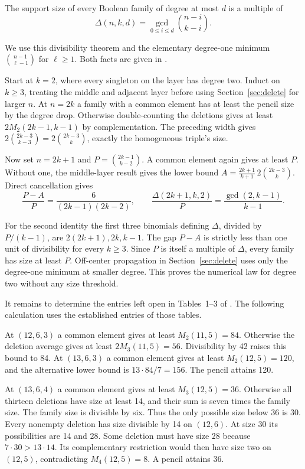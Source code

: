 \documentclass[11pt,letterpaper]{article}
\numberwithin{equation}{section}
\begin{document}
The support size of every Boolean family of degree at most $d$ is a multiple of
\[
\Delta(n,k,d)=\gcd_{0\le i\le d}\binom{n-i}{k-i}.
\]

We use this divisibility theorem and the elementary degree-one minimum $\binom{n-1}{\ell-1}$
for $\ell\ge1$. Both facts are given in \cite[Sections 2 and 7]{kmw}.

Start at $k=2$, where every singleton on the layer has degree two. Induct on $k\ge3$, treating
the middle and adjacent layer before using Section~\ref{sec:delete} for larger $n$. At $n=2k$
a family with a common element has at least the pencil size by the degree drop. Otherwise
double-counting the deletions gives at least $2M_{2}(2k-1,k-1)$ by complementation. The
preceding width gives $2\binom{2k-3}{k-3}=2\binom{2k-3}{k}$, exactly the homogeneous triple's
size.

Now set $n=2k+1$ and $P=\binom{2k-1}{k-2}$. A common element again gives at least $P$. Without
one, the middle-layer result gives the lower bound $A=\frac{2k+1}{k+1}\,2\binom{2k-3}{k}$.
Direct cancellation gives
\[
\frac{P-A}{P}=\frac{6}{(2k-1)(2k-2)},\qquad
\frac{\Delta(2k+1,k,2)}{P}=\frac{\gcd(2,k-1)}{k-1}.
\]

For the second identity the first three binomials defining $\Delta$, divided by $P/(k-1)$, are
$2(2k+1),2k,k-1$. The gap $P-A$ is strictly less than one unit of divisibility for every
$k\ge3$. Since $P$ is itself a multiple of $\Delta$, every family has size at least $P$.
Off-center propagation in Section~\ref{sec:delete} uses only the degree-one minimum at smaller
degree. This proves the numerical law for degree two without any size threshold.

It remains to determine the entries left open in Tables~1--3 of \cite{kmw}. The following
calculation uses the established entries of those tables.

At $(12,6,3)$ a common element gives at least $M_{2}(11,5)=84$. Otherwise the deletion average
gives at least $2M_{3}(11,5)=56$. Divisibility by 42 raises this bound to 84. At $(13,6,3)$ a
common element gives at least $M_{2}(12,5)=120$, and the alternative lower bound is
$13\cdot84/7=156$. The pencil attains 120.

At $(13,6,4)$ a common element gives at least $M_{3}(12,5)=36$. Otherwise all thirteen
deletions have size at least 14, and their sum is seven times the family size. The family size
is divisible by six. Thus the only possible size below 36 is 30. Every nonempty deletion has
size divisible by 14 on $(12,6)$. At size 30 its possibilities are 14 and 28. Some deletion
must have size 28 because $7\cdot30>13\cdot14$. Its complementary restriction would then have
size two on $(12,5)$, contradicting $M_{4}(12,5)=8$. A pencil attains 36.
\end{document}
